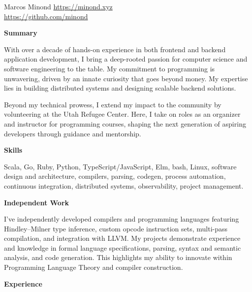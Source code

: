 \documentclass[10pt]{article}
\newcommand{\SectionTitle}[2][.2in] {
  \vspace{#1}
  \textbf{\large #2}
  \vspace{.1in}
}
\begin{document}
\begin{flushleft}

\huge{Marcos Minond} \normalsize
\hfill \href{https://minond.xyz}{https://minond.xyz} \\
\hfill \href{https://github.com/minond}{https://github.com/minond}

\normalsize


\SectionTitle[.1in]{Summary}

With over a decade of hands-on experience in both frontend and backend
application development, I bring a deep-rooted passion for computer science
and software engineering to the table. My commitment to programming is
unwavering, driven by an innate curiosity that goes beyond money. My
expertise lies in building distributed systems and designing scalable backend
solutions.

\vspace{.08in}

Beyond my technical prowess, I extend my impact to the community by
volunteering at the Utah Refugee Center. Here, I take on roles as an
organizer and instructor for programming courses, shaping the next generation
of aspiring developers through guidance and mentorship.

\SectionTitle{Skills}

Scala, Go, Ruby, Python, TypeScript/JavaScript, Elm, bash, Linux, software
design and architecture, compilers, parsing, codegen, process automation,
continuous integration, distributed systems, observability, project management.

\SectionTitle{Independent Work}

I've independently developed compilers and programming languages featuring
Hindley–Milner type inference, custom opcode instruction sets, multi-pass
compilation, and integration with LLVM. My projects demonstrate experience
and knowledge in formal language specifications, parsing, syntax and semantic
analysis, and code generation. This highlights my ability to innovate within
Programming Language Theory and compiler construction.

\SectionTitle{Experience}


\end{flushleft}
\end{document}
